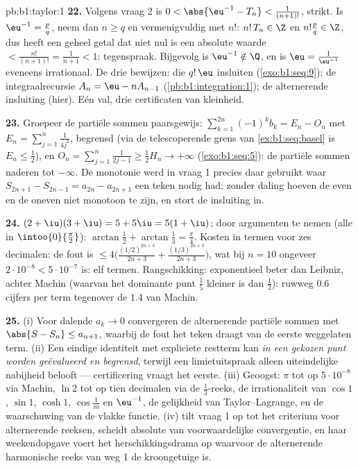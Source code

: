 \begin{solution}{pb:b1:taylor:1}
\textbf{22.} Volgens vraag 2 is $0 < \abs{\eu^{-1} - T_n} <
\frac{1}{(n+1)!}$, strikt. Is $\eu^{-1} = \frac pq$, neem dan $n
\geq q$ en vermenigvuldig met $n!$: $n!\,T_n \in \Z$ en
$n!\frac pq \in \Z$, dus heeft een geheel getal dat niet nul is
een absolute waarde $< \frac{n!}{(n+1)!} = \frac{1}{n+1} < 1$:
tegenspraak. Bijgevolg is $\eu^{-1} \notin \Q$, en is $\eu =
\frac{1}{\eu^{-1}}$ eveneens irrationaal. De drie bewijzen:
 die $q!\,\eu$ insluiten (\cref{exo:b1:seq:9});
de integraalrecursie $A_n = \eu - nA_{n-1}$
(\cref{pb:b1:integration:1}); de alternerende insluiting (hier).
Eén val, drie certificaten van kleinheid.

\textbf{23.} Groepeer de partiële sommen paarsgewijs:
$\sum_{k=1}^{2n} (-1)^k b_k = E_n - O_n$ met $E_n =
\sum_{j=1}^{n} \frac{1}{4j^2}$, begrensd (via de telescoperende
grens van \cref{ex:b1:seq:basel} is $E_n \leq \frac12$), en $O_n
= \sum_{j=1}^{n}\frac{1}{2j-1} \geq \frac12 H_n \to +\infty$
(\cref{exo:b1:seq:5}): de partiële sommen naderen tot $-\infty$.
De monotonie werd in vraag 1 precies daar gebruikt waar $S_{2n+1}
- S_{2n-1} = a_{2n} - a_{2n+1}$ een teken nodig had: zonder
daling hoeven de even en de oneven  niet monotoon te
zijn, en stort de insluiting in.

\textbf{24.} $(2+\iu)(3+\iu) = 5 + 5\iu = 5(1+\iu)$; door
argumenten te nemen (alle in $\intoo{0}{\frac\pi2}$):
$\arctan\frac12 + \arctan\frac13 = \frac\pi4$. Kosten in termen
voor zes decimalen: de fout is $\leq
4\bigl(\frac{(1/2)^{2n+3}}{2n+3} +
\frac{(1/3)^{2n+3}}{2n+3}\bigr)$, wat bij $n = 10$ ongeveer
$2\cdot10^{-8} < 5\cdot10^{-7}$ is: elf termen. Rangschikking:
exponentieel beter dan Leibniz, achter Machin (waarvan het
dominante punt $\frac15$ kleiner is dan $\frac12$): ruwweg $0.6$
cijfers per term tegenover de $1.4$ van Machin.

\textbf{25.} (i) Voor dalende $a_k \to 0$ convergeren de
alternerende partiële sommen met $\abs{S - S_n} \leq a_{n+1}$,
waarbij de fout het teken draagt van de eerste weggelaten term.
(ii) Een eindige identiteit met expliciete restterm kan
\emph{in een gekozen punt worden geëvalueerd en begrensd},
terwijl een limietuitspraak alleen uiteindelijke nabijheid
belooft --- certificering vraagt het eerste. (iii) Geoogst:
$\pi$ tot op $5\cdot10^{-8}$ via Machin, $\ln 2$ tot op tien
decimalen via de $\frac13$-reeks, de irrationaliteit van $\cos
1$, $\sin 1$, $\cosh 1$, $\cos\frac1m$ en $\eu^{-1}$, de
gelijkheid van Taylor--Lagrange, en de waarschuwing van de
vlakke functie. (iv)  tilt vraag 1 op tot het
criterium voor alternerende reeksen, scheidt absolute van
voorwaardelijke convergentie, en haar weekendopgave voert het
herschikkingsdrama op waarvoor de alternerende harmonische reeks
van weg 1 de kroongetuige is.
\end{solution}
